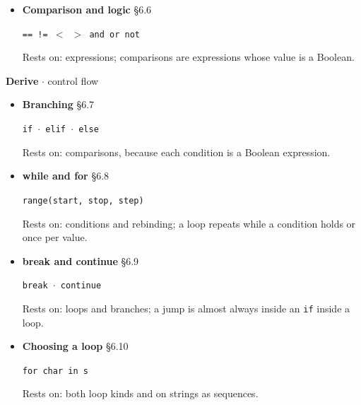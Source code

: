 \documentclass[11pt]{article}
\begin{document}
\begin{keepsection}
\begin{itemize}
\texttt{int(input(…))}

Rests on: strings and casting, because \texttt{input} always returns a string.
\item {}
\textbf{Comparison and logic} \hfill{\small\color{FAUblue}§6.6}

\texttt{== != \ensuremath{<} \ensuremath{>} and or not}

Rests on: expressions; comparisons are expressions whose value is a Boolean.
\end{itemize}

\textbf{Derive} \ensuremath{\cdot} control flow

\begin{itemize}
\item {}
\textbf{Branching} \hfill{\small\color{FAUblue}§6.7}

\texttt{if \ensuremath{\cdot} elif \ensuremath{\cdot} else}

Rests on: comparisons, because each condition is a Boolean expression.
\item {}
\textbf{while and for} \hfill{\small\color{FAUblue}§6.8}

\texttt{range(start, stop, step)}

Rests on: conditions and rebinding; a loop repeats while a condition holds or once per value.
\item {}
\textbf{break and continue} \hfill{\small\color{FAUblue}§6.9}

\texttt{break \ensuremath{\cdot} continue}

Rests on: loops and branches; a jump is almost always inside an \texttt{if} inside a loop.
\item {}
\textbf{Choosing a loop} \hfill{\small\color{FAUblue}§6.10}

\texttt{for char in s}

Rests on: both loop kinds and on strings as sequences.
\end{itemize}


\end{keepsection}
\end{document}
